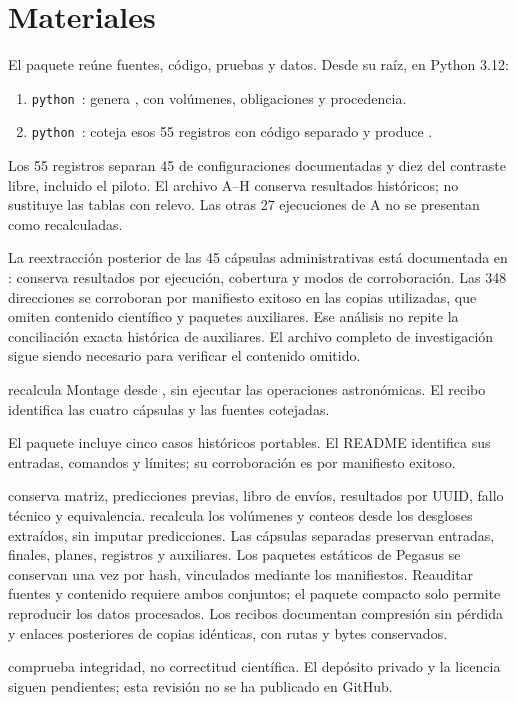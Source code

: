 \chapter{Materiales}
El paquete reúne fuentes, código, pruebas y datos. Desde su raíz, en Python 3.12:
\begin{enumerate}
\item \texttt{python}\ : genera , con volúmenes, obligaciones y procedencia.
\item \texttt{python}\ : coteja esos 55 registros con código separado y produce .
\end{enumerate}
Los 55 registros separan 45 de configuraciones documentadas y diez del contraste libre, incluido el piloto. El archivo A--H conserva resultados históricos; no sustituye las tablas con relevo. Las otras 27 ejecuciones de A no se presentan como recalculadas.

La reextracción posterior de las 45 cápsulas administrativas está documentada en : conserva resultados por ejecución, cobertura y modos de corroboración. Las 348 direcciones se corroboran por manifiesto exitoso en las copias utilizadas, que omiten contenido científico y paquetes auxiliares. Ese análisis no repite la conciliación exacta histórica de auxiliares. El archivo completo de investigación sigue siendo necesario para verificar el contenido omitido.

 recalcula Montage desde , sin ejecutar las operaciones astronómicas. El recibo identifica las cuatro cápsulas y las fuentes cotejadas.

El paquete incluye cinco casos históricos portables. El README identifica sus entradas, comandos y límites; su corroboración es por manifiesto exitoso.

 conserva matriz, predicciones previas, libro de envíos, resultados por UUID, fallo técnico y equivalencia.  recalcula los volúmenes y conteos desde los desgloses extraídos, sin imputar predicciones. Las cápsulas separadas preservan entradas, finales, planes, registros y auxiliares. Los paquetes estáticos de Pegasus se conservan una vez por hash, vinculados mediante los manifiestos. Reauditar fuentes y contenido requiere ambos conjuntos; el paquete compacto solo permite reproducir los datos procesados. Los recibos documentan compresión sin pérdida y enlaces posteriores de copias idénticas, con rutas y bytes conservados.

 comprueba integridad, no correctitud científica. El depósito privado y la licencia siguen pendientes; esta revisión no se ha publicado en GitHub.
